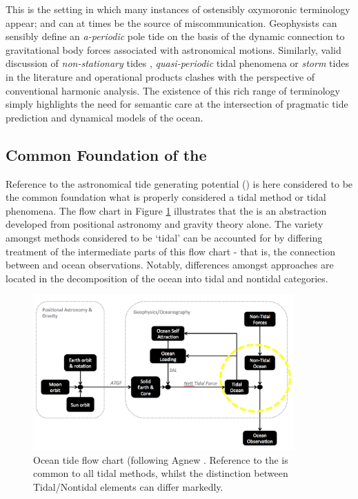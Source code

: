 This is the setting in which many instances of ostensibly oxymoronic terminology appear; and can at times be the source of miscommunication.  Geophysists can sensibly define an \emph{a-periodic} pole tide on the basis of the dynamic connection to gravitational body forces associated with astronomical motions. Similarly,  valid discussion of \emph{non-stationary} tides \cite{Ray:2011tj}, \emph{quasi-periodic} tidal phenomena \citep{Flinchem:2000kp} or \emph{storm} tides \cite{Horsburgh:2008gw} in the literature and operational products clashes with the perspective of conventional harmonic analysis.  The existence of this rich range of terminology simply highlights the need for semantic care at the intersection of pragmatic tide prediction and dynamical models of the ocean.\\


\subsection{Common Foundation of the \ATGP{}}
Reference to the astronomical tide generating potential (\ATGP{}) is here considered to be the common foundation what is properly considered a tidal method or tidal phenomena.  The flow chart in Figure \ref{fig:TIDE_FORCE_FLOW} illustrates that the \ATGP{} is an abstraction developed from positional astronomy and gravity theory alone.   The variety amongst methods considered to be `tidal' can be accounted for by differing treatment of the intermediate parts of this flow chart - that is, the connection between \ATGP{} and ocean observations.  Notably, differences amongst approaches are located in the decomposition of the ocean into tidal and nontidal categories.\\

\begin{figure}[h]
\begin{center}
\includegraphics[width=100mm]{figures/diagrams/tidal_force_flowchart.png}
\caption{Ocean tide flow chart (following Agnew \citep{Agnew:2011ub}.  Reference to the \ATGP{} is common to all tidal methods, whilst the distinction between Tidal/Nontidal elements can differ markedly.}
\label{fig:TIDE_FORCE_FLOW}
\end{center}
\end{figure}


